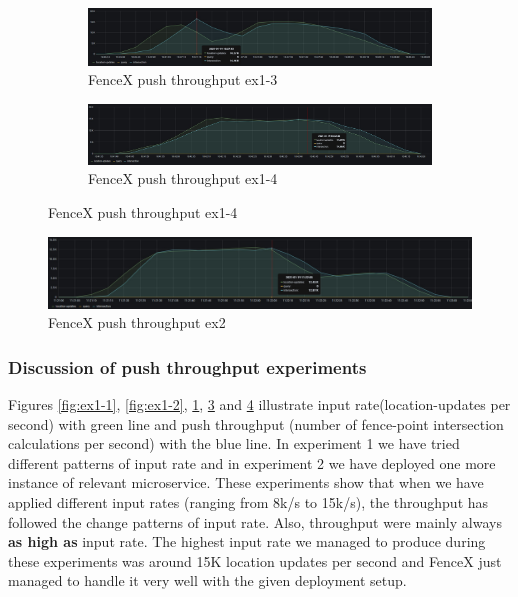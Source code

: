 \documentclass[a4]{report}
\begin{document}
    \begin{figure}
        \centering
        \begin{subfigure}[b]{\textwidth}
            \centering
            \caption{FenceX push throughput ex1-3}
            \label{fig:ex1-3}
            \includegraphics[width=\textwidth, height=0.3\textheight, scale=2]{images/evaluation/ex1-benchmarking(22,9).png}
        \end{subfigure}

        \begin{subfigure}[b]{\textwidth}
            \centering
            \caption{FenceX push throughput ex1-4}
            \label{fig:ex1-4}
            \includegraphics[width=\textwidth, height=0.3\textheight, scale=2]{images/evaluation/ex1-benchmarking(23,10).png}
        \end{subfigure}
    \end{figure}

    \begin{figure}
        \caption{FenceX push throughput ex2}
        \label{fig:ex2}
        \includegraphics[width=\textwidth, height=0.3\textheight]{images/evaluation/ex2-benchmarking(24,10).png}
    \end{figure}

    \clearpage

    \subsubsection{Discussion of push throughput experiments}
    Figures \ref{fig:ex1-1}, \ref{fig:ex1-2}, \ref{fig:ex1-3}, \ref{fig:ex1-4} and \ref{fig:ex2} illustrate input
    rate(location-updates per second) with green line and push throughput (number of fence-point intersection
    calculations per second) with the blue line.
    In experiment 1 we have tried different patterns of input rate and in experiment 2 we have deployed one more
    instance of relevant microservice.
    These experiments show that when we have applied different input rates (ranging from 8k/s to 15k/s), the throughput
    has followed the change patterns of input rate.
    Also, throughput were mainly always \textbf{as high as} input rate.
    The highest input rate we managed to produce during these experiments was around 15K location updates per second
    and FenceX just managed to handle it very well with the given deployment setup.
\end{document}
